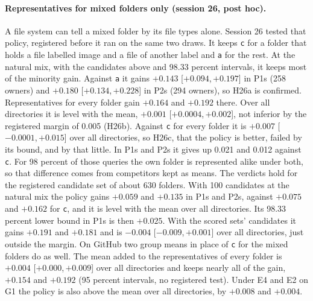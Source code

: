 \documentclass[11pt]{article}
\newcommand{\rep}[1]{\texttt{#1}}
\newcommand{\ci}[2]{[\ensuremath{#1},\,\ensuremath{#2}]}  %
\begin{document}
\paragraph{Representatives for mixed folders only (session 26, post hoc).} A file system can tell a mixed folder by its file types alone. Session 26 tested that policy, registered before it ran on the same two draws. It keeps \rep{c} for a folder that holds a file labelled image and a file of another label and \rep{a} for the rest. At the natural mix, with the candidates above and 98.33 percent intervals, it keeps most of the minority gain. Against \rep{a} it gains $+0.143$ \ci{+0.094}{+0.197} in P1s (258 owners) and $+0.180$ \ci{+0.134}{+0.228} in P2s (294 owners), so H26a is confirmed. Representatives for every folder gain $+0.164$ and $+0.192$ there. Over all directories it is level with the mean, $+0.001$ \ci{+0.0004}{+0.002}, not inferior by the registered margin of 0.005 (H26b). Against \rep{c} for every folder it is $+0.007$ \ci{-0.0001}{+0.015} over all directories, so H26c, that the policy is better, failed by its bound, and by that little. In P1s and P2s it gives up 0.021 and 0.012 against \rep{c}. For 98 percent of those queries the own folder is represented alike under both, so that difference comes from competitors kept as means. The verdicts hold for the registered candidate set of about 630 folders. With 100 candidates at the natural mix the policy gains $+0.059$ and $+0.135$ in P1s and P2s, against $+0.075$ and $+0.162$ for \rep{c}, and it is level with the mean over all directories. Its 98.33 percent lower bound in P1s is then $+0.025$. With the scored sets' candidates it gains $+0.191$ and $+0.181$ and is $-0.004$ \ci{-0.009}{+0.001} over all directories, just outside the margin. On GitHub two group means in place of \rep{c} for the mixed folders do as well. The mean added to the representatives of every folder is $+0.004$ \ci{+0.000}{+0.009} over all directories and keeps nearly all of the gain, $+0.154$ and $+0.192$ (95 percent intervals, no registered test). Under E4 and E2 on G1 the policy is also above the mean over all directories, by $+0.008$ and $+0.004$.
\end{document}
